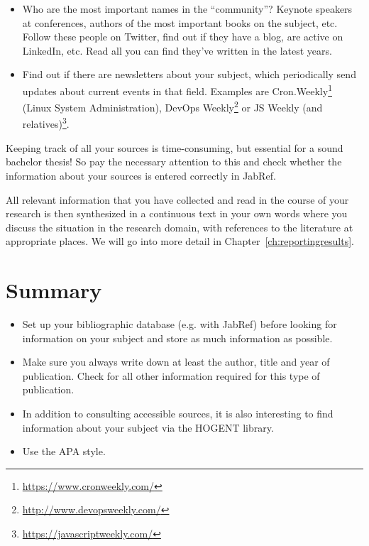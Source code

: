 \begin{itemize}
  \item Who are the most important names in the ``community''? Keynote speakers at conferences, authors of the most important books on the subject, etc. Follow these people on Twitter, find out if they have a blog, are active on LinkedIn, etc. Read all you can find they've written in the latest years.
  
  \item Find out if there are newsletters about your subject, which periodically send updates about current events in that field. Examples are Cron.Weekly\footnote{\url{https://www.cronweekly.com/}} (Linux System Administration), DevOps Weekly\footnote{\url{http://www.devopsweekly.com/}} or JS Weekly (and relatives)\footnote{\url{https://javascriptweekly.com/}}.
\end{itemize}

Keeping track of all your sources is time-consuming, but essential for a sound bachelor thesis! So pay the necessary attention to this and check whether the information about your sources is entered correctly in JabRef.

All relevant information that you have collected and read in the course of your research is then synthesized in a continuous text in your own words where you discuss the situation in the research domain, with references to the literature at appropriate places. We will go into more detail in Chapter~\ref{ch:reportingresults}.

\section{Summary}
\label{sec:bibliography-summary}

\begin{itemize}
    \item Set up your bibliographic database (e.g. with JabRef) before looking for information on your subject and store as much information as possible.
    \item Make sure you always write down at least the author, title and year of publication. Check for all other information required for this type of publication.
    \item In addition to consulting accessible sources, it is also interesting to find information about your subject via the HOGENT library.
    \item Use the APA style. 
\end{itemize}
